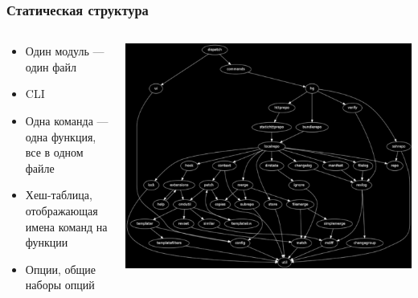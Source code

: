 \documentclass{../cscslides}
\begin{document}
    \begin{frame}
        \frametitle{Статическая структура}
        \begin{columns}
            \begin{column}{0.4\textwidth}
                \begin{itemize}
                    \item Один модуль --- один файл
                    \item CLI
                    \item Одна команда --- одна функция, все в одном файле
                    \item Хеш-таблица, отображающая имена команд на функции
                    \item Опции, общие наборы опций
                \end{itemize}
            \end{column}
            \begin{column}{0.6\textwidth}
                \includegraphics[width=\textwidth]{mercurialImportGraphBlack.png}
            \end{column}
        \end{columns}
    \end{frame}
\end{document}

